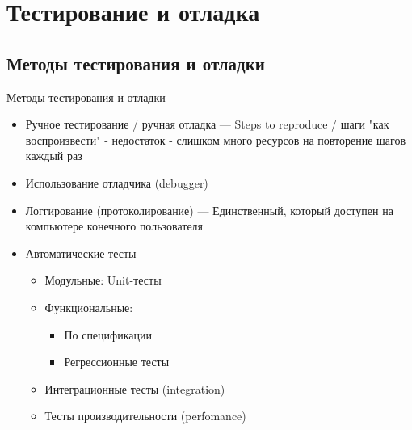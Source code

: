 \section{Тестирование и отладка}

\subsection{Методы тестирования и отладки}

\begin{frame}[t]{Методы тестирования и отладки}

  \begin{itemize}
    \item Ручное тестирование / ручная отладка --- Steps to reproduce / шаги "как воспроизвести" - 
      недостаток - слишком много ресурсов на повторение шагов каждый раз
    \item Использование отладчика (debugger)
    \item Логгирование (протоколирование) --- Единственный, который доступен на компьютере конечного пользователя
    \item Автоматические тесты
    \begin{itemize}
      \item Модульные: Unit-тесты
      \item Функциональные:
      \begin{itemize}
        \item По спецификации 
        \item Регрессионные тесты
      \end{itemize}
      \item Интеграционные тесты (integration)
      \item Тесты производительности (perfomance)
    \end{itemize}  
  \end{itemize}
\end{frame}
